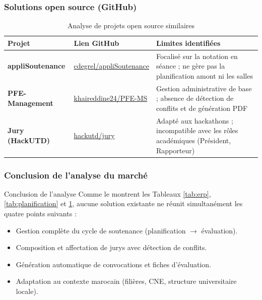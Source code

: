 \documentclass[12pt,a4paper]{article}
\begin{document}
\subsubsection{Solutions open source (GitHub)}
\label{subsubsec:opensource}

\begin{table}[H]
    \centering
    \small
    \begin{tabular}{lp{5cm}p{6cm}}
        \toprule
        \rowcolor{primary!10}
        \textbf{Projet}          & \textbf{Lien GitHub}                                                                & \textbf{Limites identifiées}                                                            \\
        \midrule
        \textbf{appliSoutenance} & \href{https://github.com/cdegrel/appliSoutenance}{cdegrel/appliSoutenance}          & Focalisé sur la notation en séance ; ne gère pas la planification amont ni les salles   \\
        \addlinespace
        \textbf{PFE-Management}  & \href{https://github.com/khaireddine24/PFE-Management-System}{khaireddine24/PFE-MS} & Gestion administrative de base ; absence de détection de conflits et de génération PDF  \\
        \addlinespace
        \textbf{Jury (HackUTD)}  & \href{https://github.com/hackutd/jury}{hackutd/jury}                                & Adapté aux hackathons ; incompatible avec les rôles académiques (Président, Rapporteur) \\
        \bottomrule
    \end{tabular}
    \caption{Analyse de projets open source similaires}
    \label{tab:opensource}
\end{table}

\subsubsection{Conclusion de l'analyse du marché}
\label{subsubsec:conclusion_marche}

\begin{projectbox}{Conclusion de l'analyse}
    Comme le montrent les Tableaux \ref{tab:erp}, \ref{tab:planification} et \ref{tab:opensource},
    aucune solution existante ne réunit simultanément les quatre points suivants :
    \begin{itemize}[label=\textcolor{primary}{\textbullet}, leftmargin=1cm]
        \item Gestion complète du cycle de soutenance
              (planification \(\rightarrow\) évaluation).
        \item Composition et affectation de jurys avec détection de conflits.
        \item Génération automatique de convocations et fiches d'évaluation.
        \item Adaptation au contexte marocain (filières, CNE, structure
              universitaire locale).
    \end{itemize}
\end{projectbox}
\end{document}
